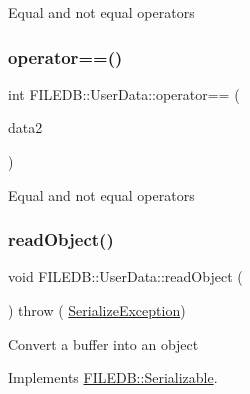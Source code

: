 Equal and not equal operators \mbox{\label{classFILEDB_1_1UserData_a1ba93b241613cfbecceabb9bf1040d2e}} 
\subsubsection{\texorpdfstring{operator==()}{operator==()}\hspace{0.1cm}{\footnotesize\ttfamily [3/3]}}
{\footnotesize\ttfamily int F\+I\+L\+E\+D\+B\+::\+User\+Data\+::operator== (\begin{DoxyParamCaption}\item[{const \mbox{\hyperlink{classFILEDB_1_1UserData}{User\+Data}} \&}]{data2 }\end{DoxyParamCaption})}

Equal and not equal operators \mbox{\label{classFILEDB_1_1UserData_a61ccded861bac4b772af2488a2cc7605}} 
\subsubsection{\texorpdfstring{readObject()}{readObject()}\hspace{0.1cm}{\footnotesize\ttfamily [1/3]}}
{\footnotesize\ttfamily void F\+I\+L\+E\+D\+B\+::\+User\+Data\+::read\+Object (\begin{DoxyParamCaption}\item[{const std\+::string \&}]{ }\end{DoxyParamCaption}) throw ( \mbox{\hyperlink{classFILEDB_1_1SerializeException}{Serialize\+Exception}}) \hspace{0.3cm}{\ttfamily [virtual]}}

Convert a buffer into an object 

Implements \mbox{\hyperlink{classFILEDB_1_1Serializable_a21a5831fa4f65790490a8a5eba9fcab2}{F\+I\+L\+E\+D\+B\+::\+Serializable}}.

\mbox{\label{classFILEDB_1_1UserData_a61ccded861bac4b772af2488a2cc7605}} 
